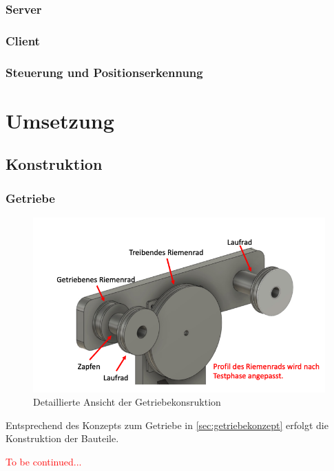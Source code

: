 \subsection{Server}
\subsection{Client}
\subsection{Steuerung und Positionserkennung}

\chapter{Umsetzung}
\section{Konstruktion}
\subsection{Getriebe}
\begin{figure}[h]
	\begin{center}
		\includegraphics[width=17cm]{getriebe.png}
		\caption{Detaillierte Ansicht der Getriebekonsruktion}
		\label{pic:getriebe}
	\end{center}
\end{figure}

Entsprechend des Konzepts zum Getriebe in \autoref{sec:getriebekonzept} erfolgt die Konstruktion der Bauteile.   

\textcolor{red}{To be continued...}

	